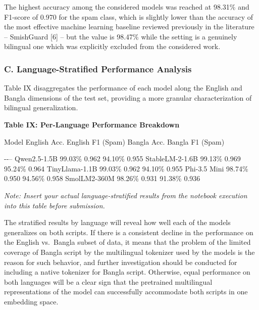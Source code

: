 The highest accuracy among the considered models was reached at 98.31\%
and F1-score of 0.970 for the spam class, which is slightly lower than
the accuracy of the most effective machine learning baseline reviewed
previously in the literature -- SmishGuard {[}6{]} -- but the value is
98.47\% while the setting is a genuinely bilingual one which was
explicitly excluded from the considered work.

\subsubsection{C. Language-Stratified Performance
Analysis}\label{c.-language-stratified-performance-analysis}

Table IX disaggregates the performance of each model along the English
and Bangla dimensions of the test set, providing a more granular
characterization of bilingual generalization.

\textbf{Table IX: Per-Language Performance Breakdown}

Model \textbar{} English Acc. \textbar{} English F1 (Spam) \textbar{}
Bangla Acc. \textbar{} Bangla F1 (Spam) \textbar{}

\textbar-\textbar-\textbar\textbar\textbar--\textbar{} \textbar{}
Qwen2.5-1.5B \textbar{} 99.03\% \textbar{} 0.962 \textbar{} 94.10\%
\textbar{} 0.955 \textbar{} \textbar{} StableLM-2-1.6B \textbar{}
99.13\% \textbar{} 0.969 \textbar{} 95.24\% \textbar{} 0.964 \textbar{}
\textbar{} TinyLlama-1.1B \textbar{} 99.03\% \textbar{} 0.962 \textbar{}
94.10\% \textbar{} 0.955 \textbar{} \textbar{} Phi-3.5 Mini \textbar{}
98.74\% \textbar{} 0.950 \textbar{} 94.56\% \textbar{} 0.958 \textbar{}
\textbar{} SmolLM2-360M \textbar{} 98.26\% \textbar{} 0.931 \textbar{}
91.38\% \textbar{} 0.936 \textbar{}

\emph{Note: Insert your actual language-stratified results from the
notebook execution into this table before submission.}

The stratified results by language will reveal how well each of the
models generalizes on both scripts. If there is a consistent decline in
the performance on the English vs.~Bangla subset of data, it means that
the problem of the limited coverage of Bangla script by the multilingual
tokenizer used by the models is the reason for such behavior, and
further investigation should be conducted for including a native
tokenizer for Bangla script. Otherwise, equal performance on both
languages will be a clear sign that the pretrained multilingual
representations of the model can successfully accommodate both scripts
in one embedding space.

